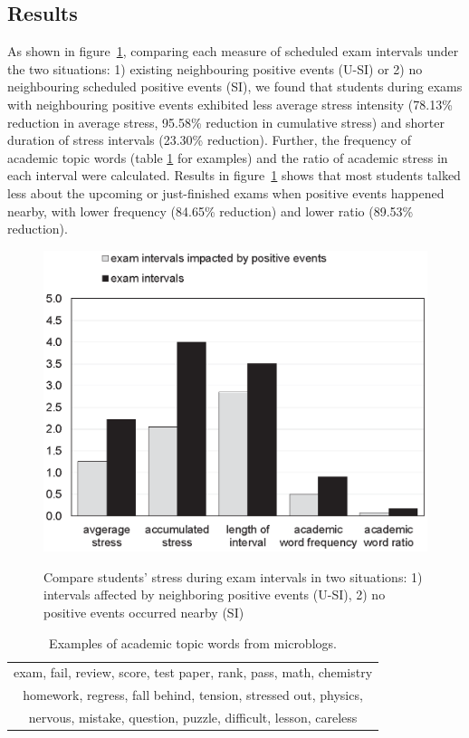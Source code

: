 \subsection{Results}
As shown in figure~\ref{fig:frequency},
comparing each measure of scheduled exam intervals under the two situations:
1) existing neighbouring positive events (U-SI) or 2) no neighbouring scheduled positive events (SI),
we found that students during exams with neighbouring positive events exhibited less average stress intensity
(78.13\% reduction in average stress, 95.58\%  reduction in cumulative stress)
and shorter duration of stress intervals (23.30\% reduction).
Further, the frequency of academic topic words (table \ref{tab:studyWords} for examples)
and the ratio of academic stress in each interval were calculated.
Results in figure~\ref{fig:frequency} shows that most students talked less about the upcoming or just-finished exams when positive events happened nearby,
with lower frequency (84.65\% reduction) and lower ratio (89.53\% reduction).

\begin{figure}[h]
\centering
\caption{\small{Compare students' stress during exam intervals in two situations:
1) intervals affected by neighboring positive events (U-SI), 2) no positive events occurred nearby (SI)}}
\includegraphics[width=0.8\linewidth]{figs/obnew-color.eps}
\label{fig:frequency}
\end{figure}


\begin{table}[h]
\centering
\caption{\small{Examples of academic topic words from microblogs.}}
\label{tab:studyWords}
\small{
\begin{tabular}{c}
\toprule
exam, fail, review, score, test paper, rank, pass, math, chemistry\\
homework, regress, fall behind, tension, stressed out, physics,\\
nervous, mistake, question, puzzle, difficult, lesson, careless\\
\bottomrule
\end{tabular}
}
\end{table}

